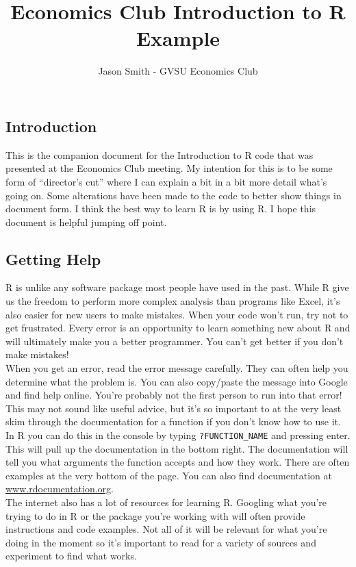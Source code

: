 \documentclass[
]{article}
\title{Economics Club Introduction to R Example}
\author{Jason Smith - GVSU Economics Club}
\date{}
\begin{document}
\maketitle

\hypertarget{introduction}{%
\subsection{Introduction}\label{introduction}}

This is the companion document for the Introduction to R code that was
presented at the Economics Club meeting. My intention for this is to be
some form of ``director's cut'' where I can explain a bit in a bit more
detail what's going on. Some alterations have been made to the code to
better show things in document form. I think the best way to learn R is
by using R. I hope this document is helpful jumping off point.

\hypertarget{getting-help}{%
\subsection{Getting Help}\label{getting-help}}

R is unlike any software package most people have used in the past.
While R give us the freedom to perform more complex analysis than
programs like Excel, it's also easier for new users to make mistakes.
When your code won't run, try not to get frustrated. Every error is an
opportunity to learn something new about R and will ultimately make you
a better programmer. You can't get better if you don't make mistakes!\\
When you get an error, read the error message carefully. They can often
help you determine what the problem is. You can also copy/paste the
message into Google and find help online. You're probably not the first
person to run into that error!\\
This may not sound like useful advice, but it's so important to at the
very least skim through the documentation for a function if you don't
know how to use it. In R you can do this in the console by typing
\texttt{?FUNCTION\_NAME} and pressing enter. This will pull up the
documentation in the bottom right. The documentation will tell you what
arguments the function accepts and how they work. There are often
examples at the very bottom of the page. You can also find documentation
at \url{www.rdocumentation.org}.\\
The internet also has a lot of resources for learning R. Googling what
you're trying to do in R or the package you're working with will often
provide instructions and code examples. Not all of it will be relevant
for what you're doing in the moment so it's important to read for a
variety of sources and experiment to find what works.
\end{document}
